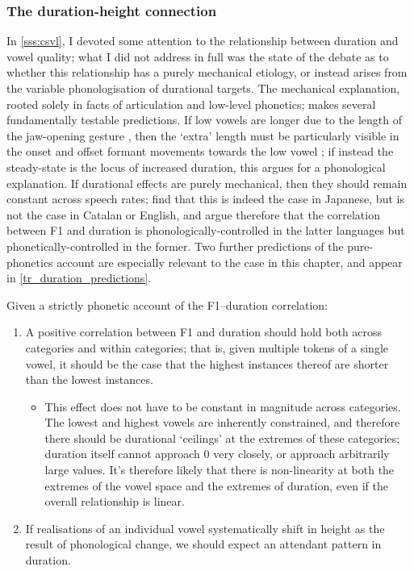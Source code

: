\subsubsection{The duration-height connection}

In \cref{sss:csvl}, I devoted some attention to the relationship between duration and vowel quality; what I did not address in full was the state of the debate as to whether this relationship has a purely mechanical etiology, or instead arises from the variable phonologisation of durational targets. The mechanical explanation, rooted solely in facts of articulation and low-level phonetics; makes several fundamentally testable predictions. If low vowels are longer due to the length of the jaw-opening gesture \citep{Lehiste1970}, then the `extra' length must be particularly visible in the onset and offset formant movements towards the low vowel \citep{Lisker1974}; if instead the steady-state is the locus of increased duration, this argues for a phonological explanation. If durational effects are purely mechanical, then they should remain constant across speech rates; \cite{Sole2010} find that this is indeed the case in Japanese, but is not the case in Catalan or English, and argue therefore that the correlation between F1 and duration is phonologically-controlled in the latter languages but phonetically-controlled in the former. Two further predictions of the pure-phonetics account are especially relevant to the case in this chapter, and appear in \cref{tr_duration_predictions}.

\begin{example}Given a strictly phonetic account of the F1–duration correlation:\label{tr_duration_predictions}
\begin{enumerate}
  \item A positive correlation between F1 and duration should hold both across categories and within categories; that is, given multiple tokens of a single vowel, it should be the case that the highest instances thereof are shorter than the lowest instances.
    \begin{itemize}
  \item This effect does not have to be constant in magnitude across categories. The lowest and highest vowels are inherently constrained, and therefore there should be durational `ceilings' at the extremes of these categories; duration itself cannot approach 0 very closely, or approach arbitrarily large values. It's therefore likely that there is non-linearity at both the extremes of the vowel space and the extremes of duration, even if the overall relationship is linear.
\end{itemize}
  \item If realisations of an individual vowel systematically shift in height as the result of phonological change, we should expect an attendant pattern in duration.
    \end{enumerate}
\end{example}

